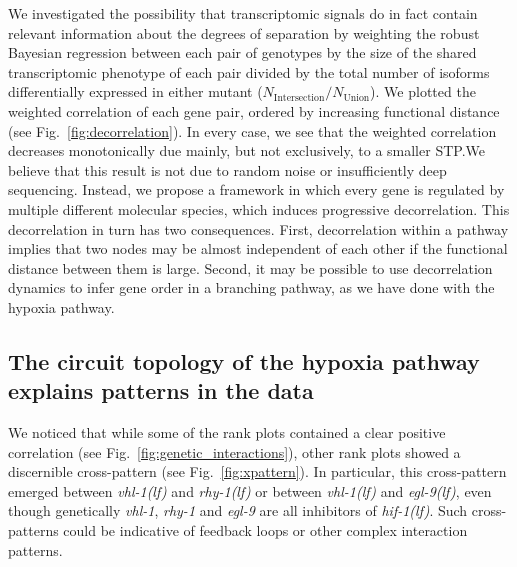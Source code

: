 \documentclass[10pt, onecolumn]{article}
\newcommand{\gene}[1]{\emph{#1}}
\newcommand{\egl}{\emph{\mbox{egl-9}(lf)}}
\newcommand{\rhy}{\emph{\mbox{rhy-1}(lf)}}
\newcommand{\vhl}{\emph{\mbox{vhl-1}(lf)}}
\newcommand{\hif}{\emph{\mbox{hif-1(lf)}}}
\begin{document}
We investigated the possibility that transcriptomic signals do in fact contain
relevant information about the degrees of separation by weighting the robust
Bayesian regression between each pair of genotypes by the size of the shared
transcriptomic phenotype of each pair divided by the total number of isoforms
differentially expressed in either mutant
($N_\mathrm{Intersection}/N_{\mathrm{Union}}$). We plotted the weighted
correlation of each gene pair, ordered by increasing functional distance
(see Fig.~\ref{fig:decorrelation}). In every case, we see that the weighted
correlation decreases monotonically due mainly, but not exclusively, to a smaller
STP.\@ We believe that this result is not due to random noise or insufficiently
deep sequencing. Instead, we propose a framework in which every gene is regulated
by multiple different molecular species, which induces progressive decorrelation.
This decorrelation in turn has two consequences. First, decorrelation within a
pathway implies that two nodes may be almost independent of each other if the
functional distance between them is large. Second, it may be possible to use
decorrelation dynamics to infer gene order in a branching pathway, as we have
done with the hypoxia pathway.

\subsection*{The circuit topology of the hypoxia pathway explains patterns in
            the data}
\label{sub:topology}
We noticed that while some of the rank plots contained a clear positive correlation
(see Fig.~\ref{fig:genetic_interactions}), other rank plots showed
a discernible cross-pattern (see Fig.~\ref{fig:xpattern}). In particular, this
cross-pattern emerged between \vhl{} and \rhy{} or between \vhl{} and \egl{},
even though genetically \gene{vhl-1}, \gene{rhy-1} and \gene{egl-9} are all
inhibitors of \hif{}. Such cross-patterns could be indicative of feedback loops
or other complex interaction patterns.
\end{document}
